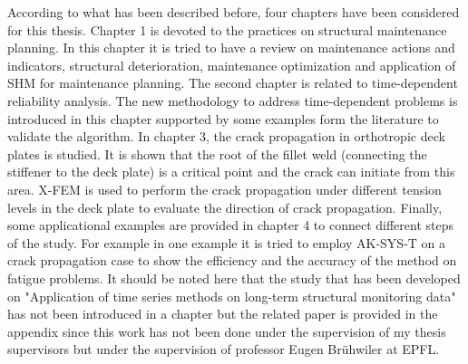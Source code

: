 \noindent
According to what has been described before, four chapters have been considered for this thesis. Chapter 1 is devoted to the practices on structural maintenance planning. In this chapter
it is tried to have a review on maintenance actions and indicators, structural deterioration, maintenance optimization and application of SHM for maintenance planning. The second chapter
is related to time-dependent reliability analysis. The new methodology to address time-dependent problems is introduced in this chapter supported by some examples form the literature to 
validate the algorithm. In chapter 3, the crack propagation in orthotropic deck plates is studied. It is shown that the root of the fillet weld (connecting the stiffener to the deck plate)
is a critical point and the crack can initiate from this area. X-FEM is used to perform the crack propagation under different tension levels in the deck plate to evaluate the direction of
crack propagation. Finally, some applicational examples are provided in chapter 4 to connect different steps of the study. For example in one example it is tried to employ AK-SYS-T on a crack 
propagation case to show the efficiency and the accuracy of the method on fatigue problems. It should be noted here that the study that has been developed on "Application of time series
methods on long-term structural monitoring data" has not been introduced in a chapter but the related paper is provided in the appendix since this work has not been done under the supervision 
of my thesis supervisors but under the supervision of professor Eugen Brühwiler at EPFL.























